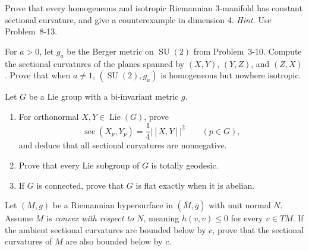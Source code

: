 \begin{exercise}
\label{prob:homogeneous-isotropic-3-manifold}

Prove that every homogeneous and isotropic Riemannian $3$-manifold has
constant sectional curvature, and give a counterexample in dimension $4$.
\emph{Hint.} Use Problem~8-13.
\end{exercise}

\begin{exercise}
\label{prob:berger-metric-su2}

For $a>0$, let $g_a$ be the Berger metric on $\operatorname{SU}(2)$ from
Problem~3-10. Compute the sectional curvatures of the planes spanned by
$(X,Y)$, $(Y,Z)$, and $(Z,X)$. Prove that when $a\neq1$,
$(\operatorname{SU}(2),g_a)$ is homogeneous but nowhere isotropic.
\end{exercise}

\begin{exercise}
\label{prob:lie-group-bi-invariant-metric-ch8}

Let $G$ be a Lie group with a bi-invariant metric $g$.
\begin{enumerate}
\item[(a)] For orthonormal $X,Y\in\operatorname{Lie}(G)$, prove
\[
\sec(X_p,Y_p)=\frac14|[X,Y]|^2
\qquad(p\in G),
\]
and deduce that all sectional curvatures are nonnegative.
\item[(b)] Prove that every Lie subgroup of $G$ is totally geodesic.
\item[(c)] If $G$ is connected, prove that $G$ is flat exactly when it is
abelian.
\end{enumerate}
\end{exercise}

\begin{exercise}
\label{prob:convex-hypersurface}

Let $(M,g)$ be a Riemannian hypersurface in
$(\overline M,\overline g)$ with unit normal $N$. Assume $M$ is
\emph{convex with respect to $N$}, meaning
$h(v,v)\leq0$ for every $v\in TM$. If the ambient sectional curvatures are
bounded below by $c$, prove that the sectional curvatures of $M$ are also
bounded below by $c$.
\end{exercise}

